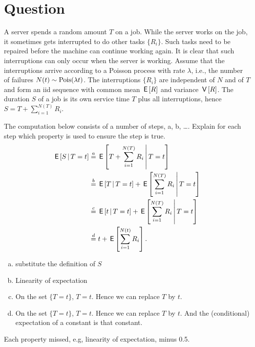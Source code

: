 \section*{Question}


A server spends a random amount $T$ on a job.
While the server works on the job, it sometimes gets interrupted to do other tasks $\{R_{i}\}$.
Such tasks need to be repaired before the machine can continue working again.
It is clear that such interruptions can only occur when the server is working.
Assume that the interruptions arrive according to a Poisson process with rate $\lambda$, i.e., the number of failures $N(t) \sim\mathrm{Pois}(\lambda t)$.
The interruptions $\{R_{i}\}$ are independent of $N$ and of $T$ and form an iid sequence with common mean $\,\mathsf{E}\left[R\right]$ and variance $\,\mathsf{V}\left[R\right]$.
The  duration $S$ of a job  is its own service time $T$ plus all interruptions, hence $S = T+ \sum_{i=1}^{N(T)} R_{i}$.

\begin{exercise}[1.5]
The computation below consists of a number of steps, a, b, \ldots. Explain for each step which property is used to ensure the step is true.
\begin{align}
\,\mathsf{E}\left[S\,\middle|\, T = t\right]
  &\stackrel{a}{=} \,\mathsf{E}\left[T + \sum_{i=1}^{N(T)} R_{i}\,\middle|\, T=t\right] \\
  &\stackrel{b}{=} \,\mathsf{E}\left[T\,\middle|\, T=t\right] + \,\mathsf{E}\left[\sum_{i=1}^{N(T)} R_{i}\,\middle|\, T=t\right] \\
  &\stackrel{c}{=} \,\mathsf{E}\left[t \,\middle|\, T=t\right] + \,\mathsf{E}\left[\sum_{i=1}^{N(T)} R_{i}\,\middle|\, T=t\right] \\
  &\stackrel{d}{=} t + \,\mathsf{E}\left[\sum_{i=1}^{N(t)} R_{i}\right].
\end{align}
\begin{solution}
  \begin{enumerate}[a.]
  \item  substitute the definition of $S$
  \item  Linearity of expectation
  \item  On the set $\{T=t\}$, $T=t$. Hence we can replace  $T$ by $t$.
  \item  On the set $\{T=t\}$, $T=t$. Hence we can replace  $T$ by $t$. And the (conditional) expectation of a constant is that constant.
  \end{enumerate}
Each  property missed, e.g, linearity of expectation, minus 0.5.
\end{solution}
\end{exercise}

